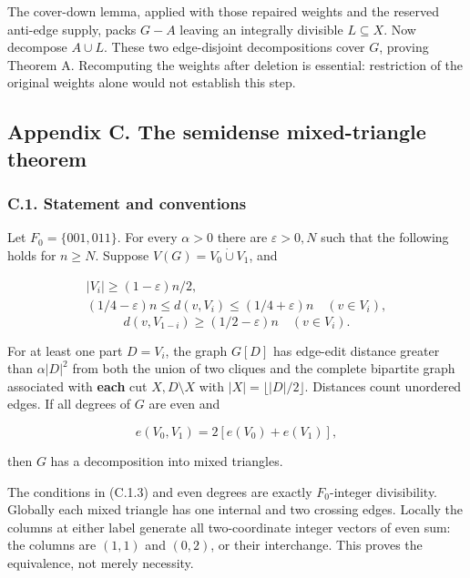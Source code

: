 \documentclass[english,11pt,a4paper]{article}
\begin{document}
The cover-down lemma, applied with those repaired weights and the reserved anti-edge supply, packs \(G-A\) leaving an integrally divisible \(L\subseteq X\). Now decompose \(A\cup L\). These two edge-disjoint decompositions cover \(G\), proving Theorem A. Recomputing the weights after deletion is essential: restriction of the original weights alone would not establish this step.

\bigskip

\subsection{Appendix C. The semidense mixed-triangle theorem}\label{appendix-c.-the-semidense-mixed-triangle-theorem}

\subsubsection{C.1. Statement and conventions}\label{c.1.-statement-and-conventions}

Let \(F_0=\{001,011\}\). For every \(\alpha>0\) there are \(\varepsilon>0,N\) such that the following holds for \(n\ge N\). Suppose \(V(G)=V_0\dot\cup V_1\), and

\[\begin{gathered}
|V_i|\ge(1-\varepsilon)n/2,\\
(1/4-\varepsilon)n\le d(v,V_i)\le(1/4+\varepsilon)n
\quad(v\in V_i),
\end{gathered}
\tag{C.1.1}\] \[d(v,V_{1-i})\ge(1/2-\varepsilon)n\quad(v\in V_i).
\tag{C.1.2}\]

For at least one part \(D=V_i\), the graph \(G[D]\) has edge-edit distance greater than \(\alpha|D|^2\) from both the union of two cliques and the complete bipartite graph associated with \textbf{each} cut \(X,D\setminus X\) with \(|X|=\lfloor|D|/2\rfloor\). Distances count unordered edges. If all degrees of \(G\) are even and

\[e(V_0,V_1)=2[e(V_0)+e(V_1)],
\tag{C.1.3}\]

then \(G\) has a decomposition into mixed triangles.

The conditions in (C.1.3) and even degrees are exactly \(F_0\)-integer divisibility. Globally each mixed triangle has one internal and two crossing edges. Locally the columns at either label generate all two-coordinate integer vectors of even sum: the columns are \((1,1)\) and \((0,2)\), or their interchange. This proves the equivalence, not merely necessity.
\end{document}
